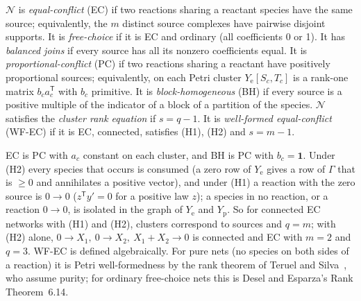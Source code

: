 \documentclass[11pt,a4paper]{report}
\newcommand{\Net}{\mathcal{N}}
\newcommand{\Ye}{Y_{\mathrm e}}
\newcommand{\Yp}{Y_{\mathrm p}}
\newcommand{\tp}{^{\mathsf T}}
\begin{document}
\begin{definition}\label{def:classes}
\(\Net\) is \emph{equal-conflict} (EC) if two reactions sharing a reactant species have the same source;
equivalently, the \(m\) distinct source complexes have pairwise disjoint supports. It is \emph{free-choice} if it is
EC and ordinary (all coefficients 0 or 1). It has \emph{balanced joins} if every source has all its nonzero
coefficients equal. It is \emph{proportional-conflict} (PC) if two reactions sharing a reactant have positively
proportional sources; equivalently, on each Petri cluster \(\Ye[S_c,T_c]\) is a rank-one matrix \(b_ca_c\tp\) with
\(b_c\) primitive. It is \emph{block-homogeneous} (BH) if every source is a positive multiple of the indicator of a
block of a partition of the species. \(\Net\) satisfies the \emph{cluster rank equation} if \(s=q-1\). It is
\emph{well-formed equal-conflict} (WF-EC) if it is EC, connected, satisfies (H1), (H2) and \(s=m-1\).
\end{definition}

EC is PC with \(a_c\) constant on each cluster, and BH is PC with \(b_c=\mathbf 1\). Under (H2) every species that
occurs is consumed (a zero row of \(\Ye\) gives a row of \(\Gamma\) that is \(\ge0\) and annihilates a positive
vector), and under (H1) a reaction with the zero source is \(0\to0\) (\(z\tp y'=0\) for a positive law \(z\)); a species
in no reaction, or a reaction \(0\to0\), is isolated in the graph of \(\Ye\) and \(\Yp\). So for connected EC networks with
(H1) and (H2), clusters correspond to sources and \(q=m\); with (H2) alone, \(0\to X_1,\ 0\to X_2,\ X_1+X_2\to0\) is
connected and EC with \(m=2\) and \(q=3\). WF-EC is defined algebraically. For pure nets
(no species on both sides of a reaction) it is Petri well-formedness by the rank theorem of Teruel and
Silva~\autocite[Thm~28]{TeruelSilva1996}, who assume purity; for ordinary free-choice nets this is Desel and
Esparza's Rank Theorem~6.14.
\end{document}
